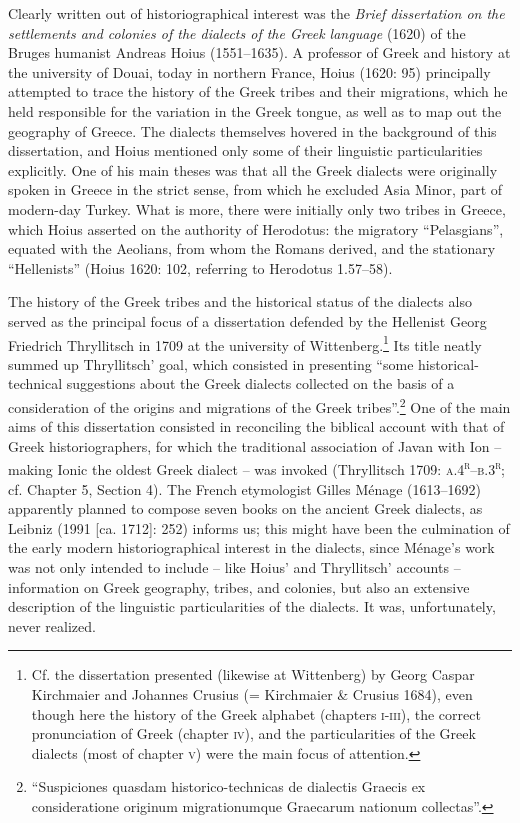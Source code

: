 \begin{styleStandard}
Clearly written out of historiographical interest was the \textit{Brief dissertation on the settlements and colonies of the dialects of the Greek language} (1620) of the Bruges humanist Andreas Hoius (1551–1635). A professor of Greek and history at the university of Douai, today in northern France, Hoius (1620: 95) principally attempted to trace the history of the Greek tribes and their migrations, which he held responsible for the variation in the Greek tongue, as well as to map out the geography of Greece. The dialects themselves hovered in the background of this dissertation, and Hoius mentioned only some of their linguistic particularities explicitly. One of his main theses was that all the Greek dialects were originally spoken in Greece in the strict sense, from which he excluded Asia Minor, part of modern-day Turkey.\textsuperscript{ }What is more, there were initially only two tribes in Greece, which Hoius asserted on the authority of Herodotus: the migratory “Pelasgians”, equated with the Aeolians, from whom the Romans derived, and the stationary “Hellenists” (Hoius 1620: 102, referring to Herodotus 1.57–58).
\end{styleStandard}

\begin{styleStandard}
The history of the Greek tribes and the historical status of the dialects also served as the principal focus of a dissertation defended by the Hellenist Georg Friedrich Thryllitsch in 1709 at the university of Wittenberg.\footnote{ Cf. the dissertation presented (likewise at Wittenberg) by Georg Caspar Kirchmaier and Johannes Crusius (= Kirchmaier \& Crusius 1684), even though here the history of the Greek alphabet (chapters \textsc{i}{}-\textsc{iii}), the correct pronunciation of Greek (chapter \textsc{iv}), and the particularities of the Greek dialects (most of chapter \textsc{v}) were the main focus of attention.} Its title neatly summed up Thryllitsch’ goal, which consisted in presenting “some historical-technical suggestions about the Greek dialects collected on the basis of a consideration of the origins and migrations of the Greek tribes”.\footnote{ “Suspiciones quasdam historico-technicas de dialectis Graecis ex consideratione originum migrationumque Graecarum nationum collectas”.} One of the main aims of this dissertation consisted in reconciling the biblical account with that of Greek historiographers, for which the traditional association of Javan with Ion – making Ionic the oldest Greek dialect – was invoked (Thryllitsch 1709: \textsc{a.4}\textsc{\textsuperscript{r}}\textsc{–b.3}\textsc{\textsuperscript{r}}; cf. Chapter 5, Section 4). The French etymologist Gilles Ménage (1613–1692) apparently planned to compose seven books on the ancient Greek dialects, as Leibniz (1991 [ca. 1712]: 252) informs us; this might have been the culmination of the early modern historiographical interest in the dialects, since Ménage’s work was not only intended to include – like Hoius’ and Thryllitsch’ accounts – information on Greek geography, tribes, and colonies, but also an extensive description of the linguistic particularities of the dialects. It was, unfortunately, never realized.
\end{styleStandard}

